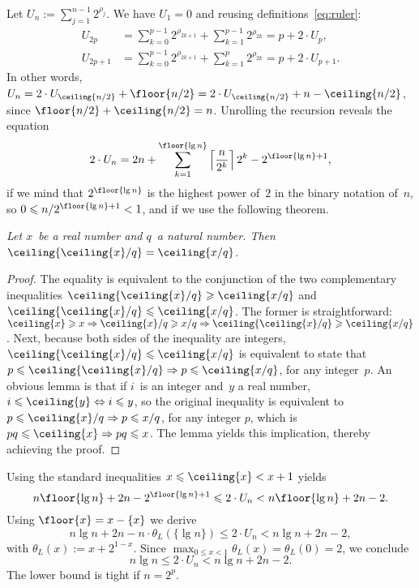 Let \(U_n := \sum_{j=1}^{n-1}2^{\rho_j}\). We have \(U_1 = 0\) and
reusing definitions~\eqref{eq:ruler}:
\begin{align*}
U_{2p}   &= \sum_{k=0}^{p-1}2^{\rho_{2k+1}} + \sum_{k=1}^{p-1}2^{\rho_{2k}}
         = p + 2 \cdot U_p,\\
U_{2p+1} &= \sum_{k=0}^{p-1}2^{\rho_{2k+1}} + \sum_{k=1}^{p}2^{\rho_{2k}} 
        = p + 2 \cdot U_{p+1}.
\end{align*}
In other words, \(U_n = 2 \cdot U_{\ceiling{n/2}} + \floor{n/2} = 2
\cdot U_{\ceiling{n/2}} + n - \ceiling{n/2}\), since \(\floor{n/2} +
\ceiling{n/2} = n\). Unrolling the recursion reveals the equation
\begin{equation*}
2 \cdot U_n = 2n + \sum_{k=1}^{\floor{\lg
    n}}\left\lceil{\frac{n}{2^k}}\right\rceil 2^k - 2^{\floor{\lg
    n}+1},
\end{equation*}
if we mind that \(2^{\floor{\lg n}}\) is the highest power of~\(2\) in
the binary notation of~\(n\), so \(0 \leqslant n/2^{\floor{\lg n}+1} <
1\), and if we use the following theorem.
\begin{thm}
\label{thm:ceilings}
\textsl{Let \(x\)~be a real number and \(q\)~a natural number. Then
  \(\ceiling{\ceiling{x}/q} = \ceiling{x/q}\).}
\end{thm}
\begin{proof}
  The equality is equivalent to the conjunction of the two
  complementary inequalities \(\ceiling{\ceiling{x}/q} \geqslant
  \ceiling{x/q}\) and \(\ceiling{\ceiling{x}/q} \leqslant
  \ceiling{x/q}\). The former is straightforward: \(\ceiling{x}
  \geqslant x \Rightarrow \ceiling{x}/q \geqslant x/q \Rightarrow
  \ceiling{\ceiling{x}/q} \geqslant \ceiling{x/q}\). Next, because
  both sides of the inequality are integers, \(\ceiling{\ceiling{x}/q}
  \leqslant \ceiling{x/q}\) is equivalent to state that \(p \leqslant
  \ceiling{\ceiling{x}/q} \Rightarrow p \leqslant \ceiling{x/q}\), for
  any integer~\(p\). An obvious lemma is that if \(i\)~is an integer
  and~\(y\) a real number, \(i \leqslant \ceiling{y} \Leftrightarrow i
  \leqslant y\), so the original inequality is equivalent to \(p
  \leqslant \ceiling{x}/q \Rightarrow p \leqslant x/q\), for any
  integer \(p\), which is \(pq \leqslant \ceiling{x} \Rightarrow pq
  \leqslant x\). The lemma yields this implication, thereby achieving
  the proof.
\end{proof}
\noindent Using the standard inequalities \(x \leqslant \ceiling{x} <
x + 1\) yields
\begin{equation*}
n\floor{\lg n} + 2n - 2^{\floor{\lg n}+1}
\leqslant 2 \cdot U_n < n\floor{\lg n} + 2n - 2.
\end{equation*}
Using \(\floor{x} = x - \{x\}\) we derive
\begin{equation*}
n\lg n + 2n - n\cdot\theta_L(\{\lg n\})
\leqslant 2 \cdot U_n < n\lg n + 2n - 2,
\end{equation*}
with \(\theta_L(x) := x + 2^{1 - x}\). Since \(\max_{0 \leqslant x <
  1}\theta_L(x) = \theta_L(0) = 2\), we conclude
\begin{equation}
n\lg n \leqslant 2 \cdot U_n < n\lg n + 2n - 2.
\label{ineq:Un}
\end{equation}
The lower bound is tight if \(n=2^p\).

